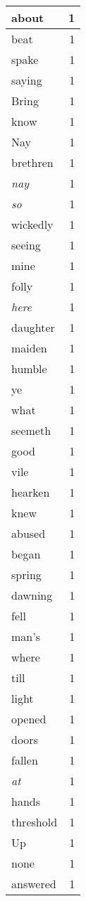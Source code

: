\begin{center}
\begin{longtable}{l|r}
about & 1 \\ \hline
beat & 1 \\ \hline
spake & 1 \\ \hline
saying & 1 \\ \hline
Bring & 1 \\ \hline
know & 1 \\ \hline
Nay & 1 \\ \hline
brethren & 1 \\ \hline
\emph{nay} & 1 \\ \hline
\emph{so} & 1 \\ \hline
wickedly & 1 \\ \hline
seeing & 1 \\ \hline
mine & 1 \\ \hline
folly & 1 \\ \hline
\emph{here} & 1 \\ \hline
daughter & 1 \\ \hline
maiden & 1 \\ \hline
humble & 1 \\ \hline
ye & 1 \\ \hline
what & 1 \\ \hline
seemeth & 1 \\ \hline
good & 1 \\ \hline
vile & 1 \\ \hline
hearken & 1 \\ \hline
knew & 1 \\ \hline
abused & 1 \\ \hline
began & 1 \\ \hline
spring & 1 \\ \hline
dawning & 1 \\ \hline
fell & 1 \\ \hline
man's & 1 \\ \hline
where & 1 \\ \hline
till & 1 \\ \hline
light & 1 \\ \hline
opened & 1 \\ \hline
doors & 1 \\ \hline
fallen & 1 \\ \hline
\emph{at} & 1 \\ \hline
hands & 1 \\ \hline
threshold & 1 \\ \hline
Up & 1 \\ \hline
none & 1 \\ \hline
answered & 1 \\ \hline

\end{longtable}
\end{center}

